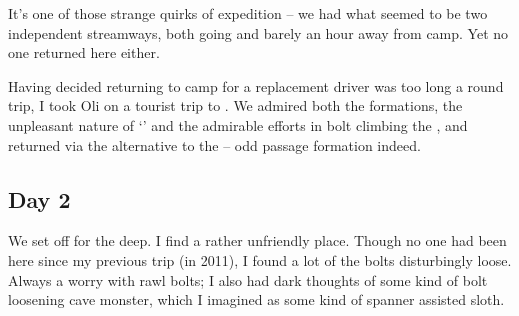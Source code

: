 It's one of those strange quirks of expedition -- we had what seemed to
be two independent streamways, both going and barely an hour away from
camp. Yet no one returned here either.

Having decided returning to camp for a replacement driver was too long a
round trip, I took Oli on a tourist trip to .
We admired both the formations, the unpleasant nature of
`' and the admirable efforts in bolt climbing the
, and returned via the  alternative to
the  -- odd passage formation indeed.


\subsection{Day 2}

We set off for the deep. I find  a rather unfriendly place.
Though no one had been here since my previous trip (in 2011), I found a
lot of the bolts disturbingly loose. Always a worry with rawl bolts; I
also had dark thoughts of some kind of bolt loosening cave monster,
which I imagined as some kind of spanner assisted sloth.


